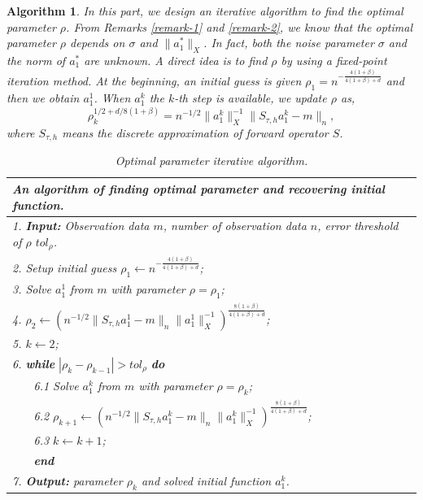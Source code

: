 \documentclass[11pt]{article}
\newtheorem{algorithm}{Algorithm}
\numberwithin{equation}{section}
\begin{document}
\begin{algorithm}
In this part, we design an iterative algorithm to find the optimal parameter $\rho$. From Remarks \ref{remark-1} and \ref{remark-2}, we know that the optimal parameter $\rho$ depends on $\sigma$ and $\|a_1^*\|_{X}$. In fact, both the noise parameter $\sigma$ and the norm of $a_1^*$ are unknown. A direct idea is to find $\rho$ by using a fixed-point iteration method. At the beginning, an initial guess is given $\rho_1=n^{-\frac{4(1+\beta)}{4(1+\beta)+d}}$ and then we obtain $a_1^1$. When $a_1^k$ the $k$-th step is available, we update $\rho$ as,
$$\rho_k^{1/2+d/8(1+\beta)}=n^{-1/2}\|a_1^k\|_{X}^{-1}\|S_{\tau,h}a_1^k-m\|_n,$$
where $S_{\tau,h}$ means the discrete approximation of forward operator $S$.

\begin{table}[!ht]
\caption{Optimal parameter iterative algorithm.}
\renewcommand{\arraystretch}{1}
\def\temptablewidth{1.0\textwidth}
\begin{center}
 \begin{tabular*}{\temptablewidth}{@{\extracolsep{\fill}}l}\hline
 \textbf{An algorithm of finding optimal parameter and recovering initial function.}\\ \hline
 1. \textbf{Input:} Observation data $m$, number of observation data $n$, error threshold of $\rho$ $tol_{\rho}$.  \\
 2. Setup initial guess $\rho_1\leftarrow n^{-\frac{4(1+\beta)}{4(1+\beta)+d}}$;   \\
 3. Solve $a_1^1$ from $m$ with parameter $\rho=\rho_1$; \\
 4. $\rho_2\leftarrow (n^{-1/2}\|S_{\tau,h}a_1^1-m\|_n\|a_1^1\|_{X}^{-1})^{\frac{8(1+\beta)}{4(1+\beta)+d}}$; \\
 5. $k \leftarrow 2$; \\
 6. \textbf{while} $|\rho_k-\rho_{k-1}|>tol_{\rho}$ \textbf{do}\\
 ~~~ 6.1 Solve $a_1^{k}$ from $m$ with parameter $\rho=\rho_k$;\\
 ~~~ 6.2 $\rho_{k+1}\leftarrow (n^{-1/2}\|S_{\tau,h}a_1^k-m\|_n\|a_1^k\|_{X}^{-1})^{\frac{8(1+\beta)}{4(1+\beta)+d}}$; \\
 ~~~ 6.3 $k \leftarrow k+1$;\\
 ~~~ \textbf{end}\\
 7. \textbf{Output:} parameter $\rho_k$ and solved initial function $a_1^{k}$.
 \\ \hline
\end{tabular*}
\end{center}
\end{table}

\end{algorithm}
\end{document}
